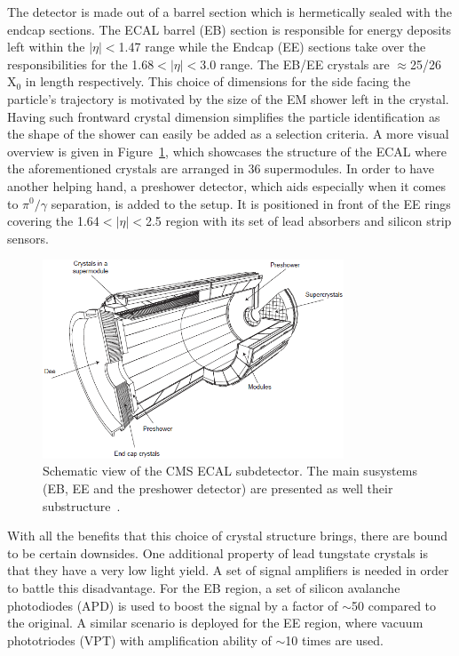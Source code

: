 \hspace{10pt} The detector is made out of a barrel section which is hermetically sealed with the endcap sections. The ECAL barrel (EB) section is responsible for energy deposits left within the $|\eta|<$1.47 range while the Endcap (EE) sections take over the responsibilities for the 1.68$<|\eta|<$3.0 range. The EB/EE crystals are $\approx$25/26 X$_\text{0}$ in length respectively. This choice of dimensions for the side facing the particle's trajectory is motivated by the size of the EM shower left in the crystal. Having such frontward crystal dimension simplifies the particle identification as the shape of the shower can easily be added as a selection criteria. A more visual overview is given in Figure~\ref{fig:ecal}, which showcases the structure of the ECAL where the aforementioned crystals are arranged in 36 supermodules. In order to have another helping hand, a preshower detector, which aids especially when it comes to $\pi^\text{0}/\gamma$ separation, is added to the setup. It is positioned in front of the EE rings covering the 1.64$<|\eta|<$2.5 region with its set of lead absorbers and silicon strip sensors.
\begin{figure}[htbp]
  \centering
    \includegraphics[width=0.8\textwidth]{CMS_experiment/CMS_ECAL.png}
  \caption[Schematic view of the CMS ECAL subdetector. The main susystems (EB, EE and the preshower detector) are presented as well their substructure]{Schematic view of the CMS ECAL subdetector. The main susystems (EB, EE and the preshower detector) are presented as well their substructure~\cite{cms:ecal}.}
  \label{fig:ecal}
\end{figure}

\hspace{10pt} With all the benefits that this choice of crystal structure brings, there are bound to be certain downsides. One additional property of lead tungstate crystals is that they have a very low light yield.  A set of signal amplifiers is needed in order to battle this disadvantage. For the EB region, a set of silicon avalanche photodiodes (APD) is used to boost the signal by a factor of $\sim$50 compared to the original. A similar scenario is deployed for the EE region, where vacuum phototriodes (VPT) with amplification ability of $\sim$10 times are used.

